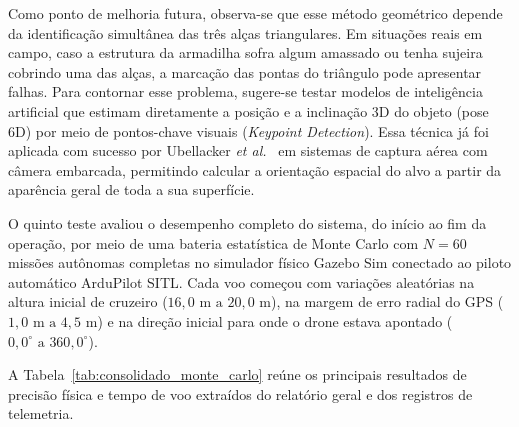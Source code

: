Como ponto de melhoria futura, observa-se que esse método geométrico depende da identificação simultânea das três alças triangulares. Em situações reais em campo, caso a estrutura da armadilha sofra algum amassado ou tenha sujeira cobrindo uma das alças, a marcação das pontas do triângulo pode apresentar falhas. Para contornar esse problema, sugere-se testar modelos de inteligência artificial que estimam diretamente a posição e a inclinação 3D do objeto (pose 6D) por meio de pontos-chave visuais (\textit{Keypoint Detection}). Essa técnica já foi aplicada com sucesso por Ubellacker \textit{et al.}~\cite{ubellacker2024} em sistemas de captura aérea com câmera embarcada, permitindo calcular a orientação espacial do alvo a partir da aparência geral de toda a sua superfície.


O quinto teste avaliou o desempenho completo do sistema, do início ao fim da operação, por meio de uma bateria estatística de Monte Carlo com $N = 60$ missões autônomas completas no simulador físico Gazebo Sim conectado ao piloto automático ArduPilot SITL. Cada voo começou com variações aleatórias na altura inicial de cruzeiro ($16,0\text{ m a } 20,0\text{ m}$), na margem de erro radial do GPS ($1,0\text{ m a } 4,5\text{ m}$) e na direção inicial para onde o drone estava apontado ($0,0^\circ\text{ a } 360,0^\circ$).

A Tabela~\ref{tab:consolidado_monte_carlo} reúne os principais resultados de precisão física e tempo de voo extraídos do relatório geral e dos registros de telemetria.

